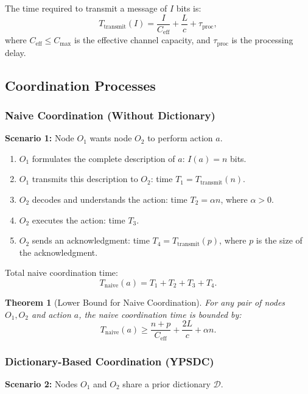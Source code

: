 \documentclass[12pt]{article}
\newtheorem{theorem}{Theorem}
\begin{document}
	The time required to transmit a message of $I$ bits is:
	\[
	T_{\text{transmit}}(I) = \frac{I}{C_{\text{eff}}} + \frac{L}{c} + \tau_{\text{proc}},
	\]
	where $C_{\text{eff}} \leq C_{\text{max}}$ is the effective channel capacity, and $\tau_{\text{proc}}$ is the processing delay.
	
	\subsection{Coordination Processes}
	\label{app:coordination-processes}
	
	\subsubsection{Naive Coordination (Without Dictionary)}
	
	\textbf{Scenario 1:} Node $O_1$ wants node $O_2$ to perform action $a$.
	
	\begin{enumerate}
		\item $O_1$ formulates the complete description of $a$: $I(a) = n$ bits.
		\item $O_1$ transmits this description to $O_2$: time $T_1 = T_{\text{transmit}}(n)$.
		\item $O_2$ decodes and understands the action: time $T_2 = \alpha n$, where $\alpha > 0$.
		\item $O_2$ executes the action: time $T_3$.
		\item $O_2$ sends an acknowledgment: time $T_4 = T_{\text{transmit}}(p)$, where $p$ is the size of the acknowledgment.
	\end{enumerate}
	
	Total naive coordination time:
	\[
	T_{\text{naive}}(a) = T_1 + T_2 + T_3 + T_4.
	\]
	
	\begin{theorem}[Lower Bound for Naive Coordination]
		\label{thm:naive-lower-bound}
		For any pair of nodes $O_1, O_2$ and action $a$, the naive coordination time is bounded by:
		\[
		T_{\text{naive}}(a) \geq \frac{n + p}{C_{\text{eff}}} + \frac{2L}{c} + \alpha n.
		\]
	\end{theorem}
	
	\subsubsection{Dictionary-Based Coordination (YPSDC)}
	
	\textbf{Scenario 2:} Nodes $O_1$ and $O_2$ share a prior dictionary $\mathcal{D}$.
	
\end{document}
